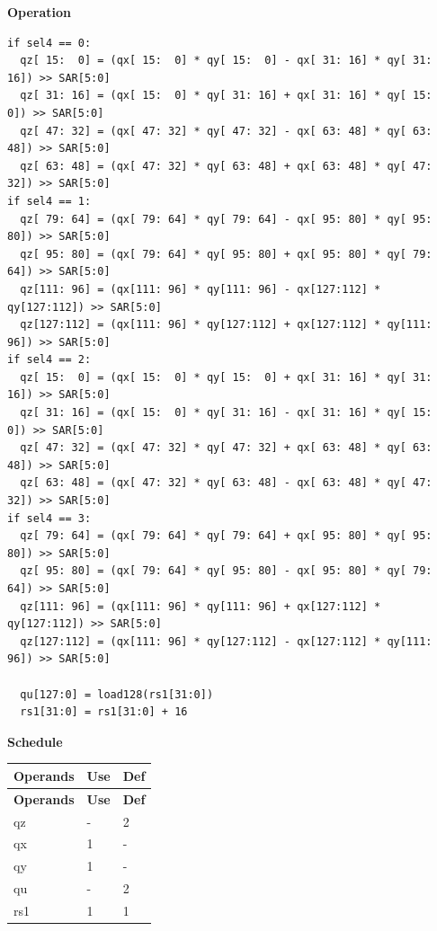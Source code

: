 \textbf{Operation}\\
\begin{lstlisting}
if sel4 == 0:
  qz[ 15:  0] = (qx[ 15:  0] * qy[ 15:  0] - qx[ 31: 16] * qy[ 31: 16]) >> SAR[5:0]
  qz[ 31: 16] = (qx[ 15:  0] * qy[ 31: 16] + qx[ 31: 16] * qy[ 15:  0]) >> SAR[5:0]
  qz[ 47: 32] = (qx[ 47: 32] * qy[ 47: 32] - qx[ 63: 48] * qy[ 63: 48]) >> SAR[5:0]
  qz[ 63: 48] = (qx[ 47: 32] * qy[ 63: 48] + qx[ 63: 48] * qy[ 47: 32]) >> SAR[5:0]
if sel4 == 1:
  qz[ 79: 64] = (qx[ 79: 64] * qy[ 79: 64] - qx[ 95: 80] * qy[ 95: 80]) >> SAR[5:0]
  qz[ 95: 80] = (qx[ 79: 64] * qy[ 95: 80] + qx[ 95: 80] * qy[ 79: 64]) >> SAR[5:0]
  qz[111: 96] = (qx[111: 96] * qy[111: 96] - qx[127:112] * qy[127:112]) >> SAR[5:0]
  qz[127:112] = (qx[111: 96] * qy[127:112] + qx[127:112] * qy[111: 96]) >> SAR[5:0]
if sel4 == 2:
  qz[ 15:  0] = (qx[ 15:  0] * qy[ 15:  0] + qx[ 31: 16] * qy[ 31: 16]) >> SAR[5:0]
  qz[ 31: 16] = (qx[ 15:  0] * qy[ 31: 16] - qx[ 31: 16] * qy[ 15:  0]) >> SAR[5:0]
  qz[ 47: 32] = (qx[ 47: 32] * qy[ 47: 32] + qx[ 63: 48] * qy[ 63: 48]) >> SAR[5:0]
  qz[ 63: 48] = (qx[ 47: 32] * qy[ 63: 48] - qx[ 63: 48] * qy[ 47: 32]) >> SAR[5:0]
if sel4 == 3:
  qz[ 79: 64] = (qx[ 79: 64] * qy[ 79: 64] + qx[ 95: 80] * qy[ 95: 80]) >> SAR[5:0]
  qz[ 95: 80] = (qx[ 79: 64] * qy[ 95: 80] - qx[ 95: 80] * qy[ 79: 64]) >> SAR[5:0]
  qz[111: 96] = (qx[111: 96] * qy[111: 96] + qx[127:112] * qy[127:112]) >> SAR[5:0]
  qz[127:112] = (qx[111: 96] * qy[127:112] - qx[127:112] * qy[111: 96]) >> SAR[5:0]

  qu[127:0] = load128(rs1[31:0])
  rs1[31:0] = rs1[31:0] + 16
\end{lstlisting}

\textbf{Schedule}\\
\begin{longtable}[c]{|l|l|l|}
    \hline
    \rowcolor{lightgray}
    \textbf{Operands} & \textbf{Use} & \textbf{Def} \\\hline
    \endfirsthead
    \hline
    \rowcolor{lightgray}
     \textbf{Operands} & \textbf{Use} & \textbf{Def} \\\hline
    \endhead
    \hline
    \endfoot


    qz & - & 2 \\\hline
     qx & 1 & - \\\hline
     qy & 1 & - \\\hline
     qu & - & 2 \\\hline
     rs1 & 1 & 1

\end{longtable}

